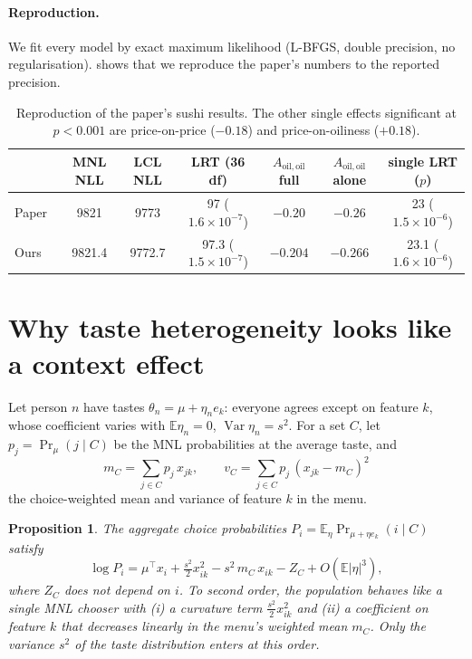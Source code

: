 \documentclass[11pt,a4paper]{article}
\newtheorem{proposition}{Proposition}
\theoremstyle{remark}
\newcommand{\Aoo}{A_{\mathrm{oil,oil}}}
\newcommand{\E}{\mathbb{E}}
\begin{document}
\paragraph{Reproduction.}
We fit every model by exact maximum likelihood (L-BFGS, double precision, no regularisation).
 shows that we reproduce the paper's numbers to the reported precision.

\begin{table}[!htbp]
\centering\small
\setlength{\tabcolsep}{4pt}
\begin{tabular}{lcccccc}
\toprule
 & MNL NLL & LCL NLL & LRT (36 df) & $\Aoo$ full & $\Aoo$ alone & single LRT ($p$) \\
\midrule
Paper~\cite{tb21} & 9821 & 9773 & 97 ($1.6\times10^{-7}$) & $-0.20$ & $-0.26$ & 23 ($1.5\times10^{-6}$)\\
Ours & 9821.4 & 9772.7 & 97.3 ($1.5\times10^{-7}$) & $-0.204$ & $-0.266$ & 23.1 ($1.6\times10^{-6}$)\\
\bottomrule
\end{tabular}
\caption{Reproduction of the paper's sushi results. The other single effects significant at $p<0.001$ are
price-on-price ($-0.18$) and price-on-oiliness ($+0.18$).}
\label{tab:repro}
\end{table}

\section{Why taste heterogeneity looks like a context effect}
\label{sec:theory}

Let person $n$ have tastes $\theta_n=\mu+\eta_n e_k$: everyone agrees except on feature $k$, whose
coefficient varies with $\E\eta_n=0$, $\operatorname{Var}\eta_n=s^2$. For a set $C$, let
$p_j=\Pr_\mu(j\mid C)$ be the MNL probabilities at the average taste, and
\[
m_C=\sum_{j\in C}p_j\,x_{jk},\qquad v_C=\sum_{j\in C}p_j\,(x_{jk}-m_C)^2
\]
the choice-weighted mean and variance of feature $k$ in the menu.

\begin{proposition}\label{prop:expansion}
The aggregate choice probabilities $P_i=\E_\eta\Pr_{\mu+\eta e_k}(i\mid C)$ satisfy
\[
\log P_i=\mu^\top x_i+\tfrac{s^2}{2}x_{ik}^2-s^2\,m_C\,x_{ik}-Z_C+O(\E|\eta|^3),
\]
where $Z_C$ does not depend on $i$. To second order, the population behaves like a single
MNL chooser with (i) a curvature term $\tfrac{s^2}{2}x_{ik}^2$ and (ii) a coefficient on feature $k$ that
\emph{decreases} linearly in the menu's weighted mean $m_C$. Only the variance $s^2$ of the taste
distribution enters at this order.
\end{proposition}
\end{document}
